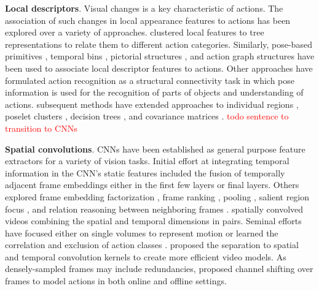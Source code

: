 \documentclass[smallextended,twocolumn,natbib]{svjour3}
\begin{document}
\noindent
\textbf{Local descriptors}. Visual changes is a key characteristic of actions. The association of such changes in local appearance features to actions has been explored over a variety of approaches. \citet{mikolajczyk2008action} clustered local features to tree representations to relate them to different action categories. Similarly, pose-based primitives \citep{thurau2008pose}, temporal bins \citep{nowozin2007discriminative}, pictorial structures \citep{tran2012part}, and action graph structures \citep{ni2014multiple} have been used to associate local descriptor features to actions. Other approaches \citep{gupta2009observing,yao2010modeling} have formulated action recognition as a structural connectivity task in which pose information is used for the recognition of parts of objects and understanding of actions.
subsequent methods have extended approaches to individual regions \citep{ikizler2010object}, poselet clusters \citep{pishchulin2013strong}, decision trees \citep{rahmani2014real}, and covariance matrices \citep{kviatkovsky2014online}. \textcolor{red}{todo sentence to transition to CNNs} 


\noindent
\textbf{Spatial convolutions}. CNNs have been established as general purpose feature extractors for a variety of vision tasks. Initial effort \citep{karpathy2014large} at integrating temporal information in the CNN's static features included the fusion of temporally adjacent frame embeddings either in the first few layers or final layers. Others explored frame embedding factorization \citep{sun2015human}, frame ranking \citep{fernando2015modeling}, pooling \citep{fernando2016rank}, salient region focus \citep{girdhar2017attentional, zong2021motion}, and relation reasoning between neighboring frames \citep{zhou2018temporal}. \citet{le2011learning} spatially convolved videos combining the spatial and temporal dimensions in pairs. Seminal efforts have focused either on single volumes to represent motion \citep{bilen2016dynamic,chung2016signs,iosifidis2012view} or learned the correlation and exclusion of action classes \citep{hoai2015improving}. \citet{tran2018closer} proposed the separation to spatial and temporal convolution kernels to create more efficient video models. As densely-sampled frames may include redundancies, \citet{lin2019tsm} proposed channel shifting over frames to model actions in both online and offline settings.
\citep{sudhakaran2020gate}
\end{document}

